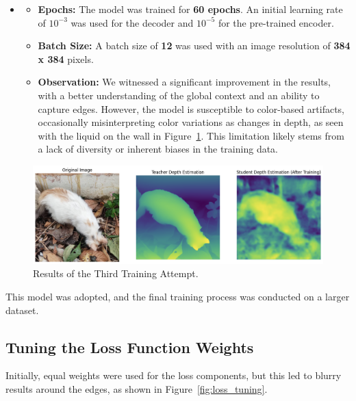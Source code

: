 \begin{enumerate}
    \begin{itemize}
        \item[]
        \begin{itemize}
            \item \textbf{Epochs:} The model was trained for \textbf{60 epochs}. An initial learning rate of \textbf{$10^{-3}$} was used for the decoder and \textbf{$10^{-5}$} for the pre-trained encoder.
            \item \textbf{Batch Size:} A batch size of \textbf{12} was used with an image resolution of \textbf{384 x 384} pixels.
            \item \textbf{Observation:} We witnessed a significant improvement in the results, with a better understanding of the global context and an ability to capture edges. However, the model is susceptible to color-based artifacts, occasionally misinterpreting color variations as changes in depth, as seen with the liquid on the wall in Figure~\ref{fig:attempt3}. This limitation likely stems from a lack of diversity or inherent biases in the training data.
        \end{itemize}
    \end{itemize}

    \begin{figure}[htbp!]
        \centering
        \includegraphics[width=\textwidth]{images/training_attempt_3.png}
        \caption{Results of the Third Training Attempt.}
        \label{fig:attempt3}
    \end{figure}
    
    This model was adopted, and the final training process was conducted on a larger dataset.
\end{enumerate}

\subsection{Tuning the Loss Function Weights}
\label{subsec:loss_tuning}

Initially, equal weights were used for the loss components, but this led to blurry results around the edges, as shown in Figure~\ref{fig:loss_tuning}.

